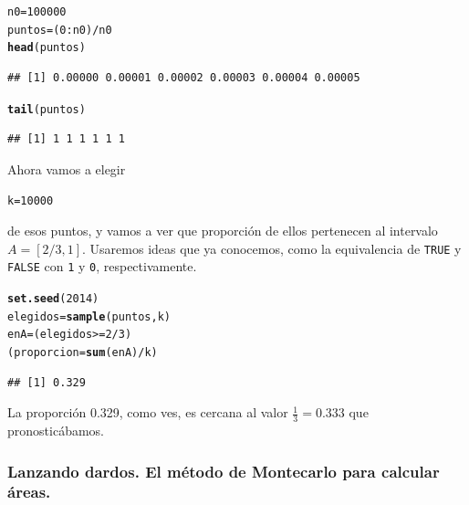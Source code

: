 \documentclass[10pt,a4paper]{article}\usepackage[]{graphicx}\usepackage[]{color}
\makeatletter
\newcommand{\hlnum}[1]{\textcolor[rgb]{0.686,0.059,0.569}{#1}}%
\newcommand{\hlopt}[1]{\textcolor[rgb]{0,0,0}{#1}}%
\newcommand{\hlstd}[1]{\textcolor[rgb]{0.345,0.345,0.345}{#1}}%
\newcommand{\hlkwb}[1]{\textcolor[rgb]{0.69,0.353,0.396}{#1}}%
\newcommand{\hlkwd}[1]{\textcolor[rgb]{0.737,0.353,0.396}{\textbf{#1}}}%
\newenvironment{kframe}{%
 \def\at@end@of@kframe{}%
 \ifinner\ifhmode%
  \def\at@end@of@kframe{\end{minipage}}%
  \begin{minipage}{\columnwidth}%
 \fi\fi%
 \def\FrameCommand##1{\hskip\@totalleftmargin \hskip-\fboxsep
 \colorbox{shadecolor}{##1}\hskip-\fboxsep
     \hskip-\linewidth \hskip-\@totalleftmargin \hskip\columnwidth}%
 \MakeFramed {\advance\hsize-\width
   \@totalleftmargin\z@ \linewidth\hsize
   \@setminipage}}%
 {\par\unskip\endMakeFramed%
 \at@end@of@kframe}
\newenvironment{knitrout}{}{} %
\makeatother
\begin{document}
\begin{knitrout}
\color{fgcolor}\begin{kframe}
\begin{alltt}
\hlstd{n0} \hlkwb{=} \hlnum{100000}
\hlstd{puntos} \hlkwb{=} \hlstd{(}\hlnum{0}\hlopt{:}\hlstd{n0)}\hlopt{/}\hlstd{n0}
\hlkwd{head}\hlstd{(puntos)}
\end{alltt}
\begin{verbatim}
## [1] 0.00000 0.00001 0.00002 0.00003 0.00004 0.00005
\end{verbatim}
\begin{alltt}
\hlkwd{tail}\hlstd{(puntos)}
\end{alltt}
\begin{verbatim}
## [1] 1 1 1 1 1 1
\end{verbatim}
\end{kframe}
\end{knitrout}
Ahora vamos a elegir
\begin{knitrout}
\color{fgcolor}\begin{kframe}
\begin{alltt}
\hlstd{k} \hlkwb{=} \hlnum{10000}
\end{alltt}
\end{kframe}
\end{knitrout}
de esos puntos, y vamos a ver que proporción de ellos pertenecen al intervalo $A=[2/3, 1]$. Usaremos ideas que ya conocemos, como la equivalencia de {\tt TRUE} y {\tt FALSE} con {\tt 1} y {\tt 0}, respectivamente.
\begin{knitrout}
\color{fgcolor}\begin{kframe}
\begin{alltt}
\hlkwd{set.seed}\hlstd{(}\hlnum{2014}\hlstd{)}
\hlstd{elegidos} \hlkwb{=} \hlkwd{sample}\hlstd{(puntos, k)}
\hlstd{enA} \hlkwb{=} \hlstd{(elegidos} \hlopt{>=} \hlnum{2}\hlopt{/}\hlnum{3}\hlstd{)}
\hlstd{(proporcion} \hlkwb{=} \hlkwd{sum}\hlstd{(enA)} \hlopt{/} \hlstd{k)}
\end{alltt}
\begin{verbatim}
## [1] 0.329
\end{verbatim}
\end{kframe}
\end{knitrout}
La proporción 0.329, como ves, es cercana al valor $\frac{1}{3}=$0.333 que pronosticábamos.

\subsubsection{Lanzando dardos. El método de Montecarlo para calcular áreas.}
\end{document}
